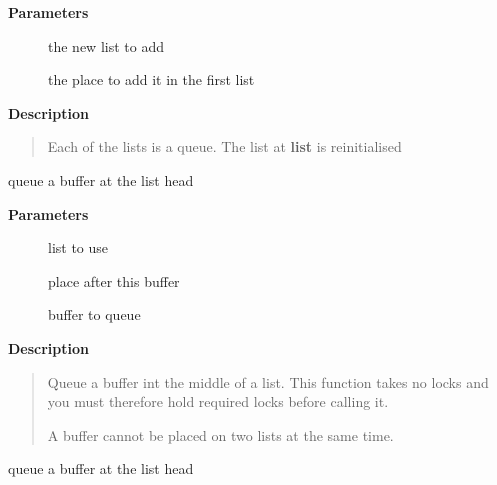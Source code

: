 \documentclass[a4paper,8pt,english]{sphinxmanual}
\begin{document}
\textbf{Parameters}
\begin{description}
\item[{}] \leavevmode
the new list to add

\item[{}] \leavevmode
the place to add it in the first list

\end{description}

\textbf{Description}
\begin{quote}

Each of the lists is a queue.
The list at \textbf{list} is reinitialised
\end{quote}

\begin{fulllineitems}
\label{networking/kapi:c.__skb_queue_after}
queue a buffer at the list head

\end{fulllineitems}


\textbf{Parameters}
\begin{description}
\item[{}] \leavevmode
list to use

\item[{}] \leavevmode
place after this buffer

\item[{}] \leavevmode
buffer to queue

\end{description}

\textbf{Description}
\begin{quote}

Queue a buffer int the middle of a list. This function takes no locks
and you must therefore hold required locks before calling it.

A buffer cannot be placed on two lists at the same time.
\end{quote}

\begin{fulllineitems}
\label{networking/kapi:c.skb_queue_head}
queue a buffer at the list head

\end{fulllineitems}
\end{document}
